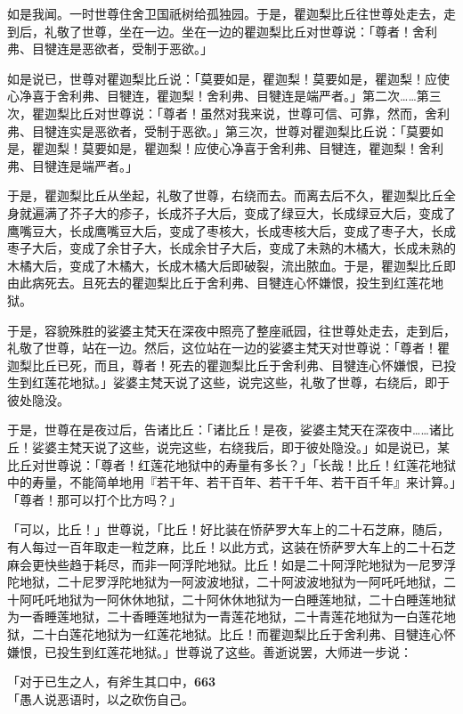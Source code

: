 如是我闻。一时世尊住舍卫国祇树给孤独园。于是，瞿迦梨比丘往世尊处走去，走到后，礼敬了世尊，坐在一边。坐在一边的瞿迦梨比丘对世尊说：「尊者！舍利弗、目犍连是恶欲者，受制于恶欲。」


如是说已，世尊对瞿迦梨比丘说：「莫要如是，瞿迦梨！莫要如是，瞿迦梨！应使心净喜于舍利弗、目犍连，瞿迦梨！舍利弗、目犍连是端严者。」第二次……第三次，瞿迦梨比丘对世尊说：「尊者！虽然对我来说，世尊可信、可靠，然而，舍利弗、目犍连实是恶欲者，受制于恶欲。」第三次，世尊对瞿迦梨比丘说：「莫要如是，瞿迦梨！莫要如是，瞿迦梨！应使心净喜于舍利弗、目犍连，瞿迦梨！舍利弗、目犍连是端严者。」


于是，瞿迦梨比丘从坐起，礼敬了世尊，右绕而去。而离去后不久，瞿迦梨比丘全身就遍满了芥子大的疹子，长成芥子大后，变成了绿豆大，长成绿豆大后，变成了鹰嘴豆大，长成鹰嘴豆大后，变成了枣核大，长成枣核大后，变成了枣子大，长成枣子大后，变成了余甘子大，长成余甘子大后，变成了未熟的木橘大，长成未熟的木橘大后，变成了木橘大，长成木橘大后即破裂，流出脓血。于是，瞿迦梨比丘即由此病死去。且死去的瞿迦梨比丘于舍利弗、目犍连心怀嫌恨，投生到红莲花地狱。


于是，容貌殊胜的娑婆主梵天在深夜中照亮了整座祇园，往世尊处走去，走到后，礼敬了世尊，站在一边。然后，这位站在一边的娑婆主梵天对世尊说：「尊者！瞿迦梨比丘已死，而且，尊者！死去的瞿迦梨比丘于舍利弗、目犍连心怀嫌恨，已投生到红莲花地狱。」娑婆主梵天说了这些，说完这些，礼敬了世尊，右绕后，即于彼处隐没。


于是，世尊在是夜过后，告诸比丘：「诸比丘！是夜，娑婆主梵天在深夜中……诸比丘！娑婆主梵天说了这些，说完这些，右绕我后，即于彼处隐没。」如是说已，某比丘对世尊说：「尊者！红莲花地狱中的寿量有多长？」「长哉！比丘！红莲花地狱中的寿量，不能简单地用『若干年、若干百年、若干千年、若干百千年』来计算。」「尊者！那可以打个比方吗？」

「可以，比丘！」世尊说，「比丘！好比装在㤭萨罗大车上的二十石芝麻，随后，有人每过一百年取走一粒芝麻，比丘！以此方式，这装在㤭萨罗大车上的二十石芝麻会更快些趋于耗尽，而非一阿浮陀地狱。比丘！如是二十阿浮陀地狱为一尼罗浮陀地狱，二十尼罗浮陀地狱为一阿波波地狱，二十阿波波地狱为一阿吒吒地狱，二十阿吒吒地狱为一阿休休地狱，二十阿休休地狱为一白睡莲地狱，二十白睡莲地狱为一香睡莲地狱，二十香睡莲地狱为一青莲花地狱，二十青莲花地狱为一白莲花地狱，二十白莲花地狱为一红莲花地狱。比丘！而瞿迦梨比丘于舍利弗、目犍连心怀嫌恨，已投生到红莲花地狱。」世尊说了这些。善逝说罢，大师进一步说：


「对于已生之人，有斧生其口中，\hfill{\grayfootnotesize \textbf{663}} \\
「愚人说恶语时，以之砍伤自己。


